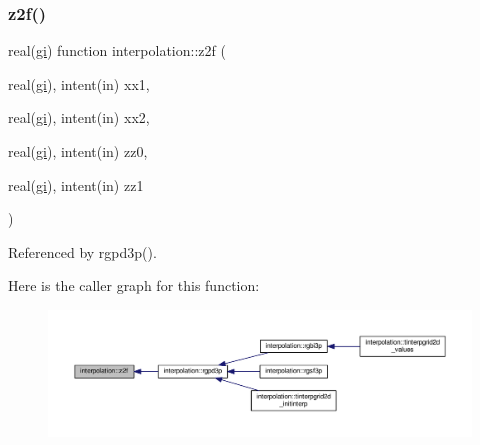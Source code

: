 \subsubsection{\texorpdfstring{z2f()}{z2f()}}
{\footnotesize\ttfamily real(\mbox{\hyperlink{namespaceinterpolation_a7242dea48715e8170bae81efe12c64be}{gi}}) function interpolation\+::z2f (\begin{DoxyParamCaption}\item[{real(\mbox{\hyperlink{namespaceinterpolation_a7242dea48715e8170bae81efe12c64be}{gi}}), intent(in)}]{xx1,  }\item[{real(\mbox{\hyperlink{namespaceinterpolation_a7242dea48715e8170bae81efe12c64be}{gi}}), intent(in)}]{xx2,  }\item[{real(\mbox{\hyperlink{namespaceinterpolation_a7242dea48715e8170bae81efe12c64be}{gi}}), intent(in)}]{zz0,  }\item[{real(\mbox{\hyperlink{namespaceinterpolation_a7242dea48715e8170bae81efe12c64be}{gi}}), intent(in)}]{zz1 }\end{DoxyParamCaption})}



Referenced by rgpd3p().

Here is the caller graph for this function\+:
\nopagebreak
\begin{figure}[H]
\begin{center}
\leavevmode
\includegraphics[width=350pt]{namespaceinterpolation_a1046109eeab848ab2641b54b30004885_icgraph}
\end{center}
\end{figure}
\mbox{\label{namespaceinterpolation_aa80e5ef1a8e693b3c094f26f166cebf2}} 
